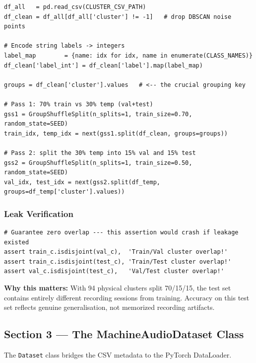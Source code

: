 \documentclass[12pt,a4paper]{article}
\begin{document}
\begin{lstlisting}
df_all   = pd.read_csv(CLUSTER_CSV_PATH)
df_clean = df_all[df_all['cluster'] != -1]   # drop DBSCAN noise points

# Encode string labels -> integers
label_map        = {name: idx for idx, name in enumerate(CLASS_NAMES)}
df_clean['label_int'] = df_clean['label'].map(label_map)

groups = df_clean['cluster'].values   # <-- the crucial grouping key

# Pass 1: 70% train vs 30% temp (val+test)
gss1 = GroupShuffleSplit(n_splits=1, train_size=0.70, random_state=SEED)
train_idx, temp_idx = next(gss1.split(df_clean, groups=groups))

# Pass 2: split the 30% temp into 15% val and 15% test
gss2 = GroupShuffleSplit(n_splits=1, train_size=0.50, random_state=SEED)
val_idx, test_idx = next(gss2.split(df_temp, groups=df_temp['cluster'].values))
\end{lstlisting}

\subsubsection{Leak Verification}

\begin{lstlisting}
# Guarantee zero overlap --- this assertion would crash if leakage existed
assert train_c.isdisjoint(val_c),  'Train/Val cluster overlap!'
assert train_c.isdisjoint(test_c), 'Train/Test cluster overlap!'
assert val_c.isdisjoint(test_c),   'Val/Test cluster overlap!'
\end{lstlisting}

\begin{successbox}
\textbf{Why this matters:} With 94 physical clusters split 70/15/15, the test set contains entirely different recording sessions from training. Accuracy on this test set reflects genuine generalisation, not memorized recording artifacts.
\end{successbox}

\subsection{Section 3 --- The MachineAudioDataset Class}

The \texttt{Dataset} class bridges the CSV metadata to the PyTorch DataLoader.
\end{document}
